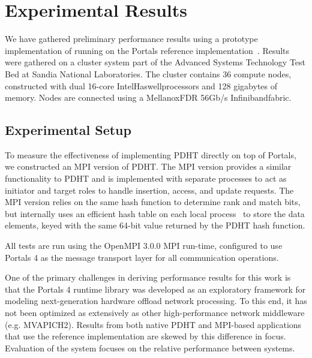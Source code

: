 \section{Experimental Results}



We have gathered preliminary performance results using a prototype
implementation of \pdht running on the Portals reference
implementation~\cite{portals-code}. Results were gathered on a cluster system
part of the Advanced Systems Technology Test Bed at Sandia National
Laboratories.  The cluster contains 36 compute nodes, constructed with dual
16-core Intel\regtm Haswell\regtm processors and 128 gigabytes of memory. Nodes
are connected using a Mellanox\othertm FDR 56Gb/s Infiniband\othertm fabric.

\subsection{Experimental Setup}

To measure the effectiveness of implementing PDHT directly on top of Portals,
we constructed an MPI version of PDHT. The MPI version provides a similar
functionality to PDHT and is implemented with separate processes to act as
initiator and target roles to handle insertion, access, and update requests.
The MPI version relies on the same hash function to determine rank and match
bits, but internally uses an efficient hash table on each local
process~\cite{uthash} to store the data elements, keyed with the same 64-bit
value returned by the PDHT hash function. 


All tests are run using the OpenMPI 3.0.0 MPI run-time, configured to use Portals
4 as the message transport layer for all communication operations.

One of the primary challenges in deriving performance results for this work is
that the Portals 4 runtime library was developed as an exploratory framework
for modeling next-generation hardware offload network processing. To this end,
it has not been optimized as extensively as other high-performance network
middleware (e.g. MVAPICH2). Results from both native PDHT and MPI-based
applications that use the reference implementation are skewed by this
difference in focus. Evaluation of the system focuses on the relative 
performance between systems.


